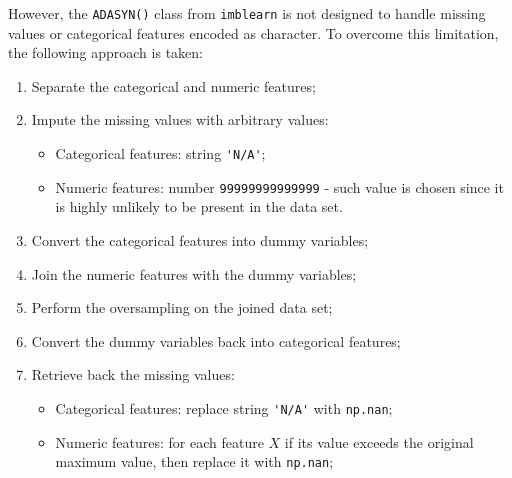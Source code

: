 However, the \lstinline{ADASYN()} class from \lstinline{imblearn} is not designed to handle missing values or categorical features encoded as character. To overcome this limitation, the following approach is taken:
\begin{enumerate}\setlength\itemsep{0em} 
\item Separate the categorical and numeric features;
\item Impute the missing values with arbitrary values:
\begin{itemize}
\item Categorical features: string \lstinline{'N/A'};
\item Numeric features: number \lstinline{99999999999999} - such value is chosen since it is highly unlikely to be present in the data set.
\end{itemize}
\item Convert the categorical features into dummy variables;
\item Join the numeric features with the dummy variables;
\item Perform the oversampling on the joined data set;
\item Convert the dummy variables back into categorical features;
\item Retrieve back the missing values:
\begin{itemize}
\item Categorical features: replace string \lstinline{'N/A'} with \lstinline{np.nan};
\item Numeric features: for each feature $X$ if its value exceeds the original maximum value, then replace it with \lstinline{np.nan};
\end{itemize}
\end{enumerate}


